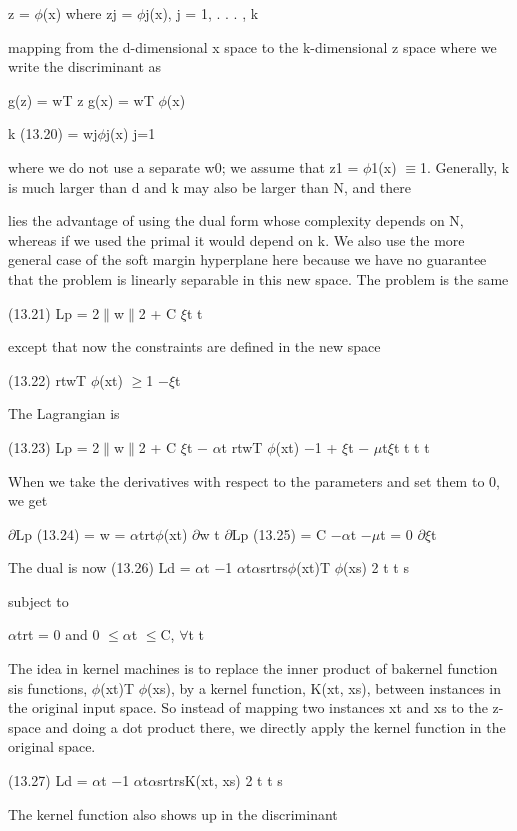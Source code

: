 z = $\phi$(x) where zj = $\phi$j(x), j = 1, . . . , k

mapping from the d-dimensional x space to the k-dimensional z space where we write the discriminant as

g(z) = wT z g(x) = wT $\phi$(x)

k (13.20) = wj$\phi$j(x) j=1

where we do not use a separate w0; we assume that z1 = $\phi$1(x) $\equiv$1. Generally, k is much larger than d and k may also be larger than N, and there

lies the advantage of using the dual form whose complexity depends on N, whereas if we used the primal it would depend on k. We also use the more general case of the soft margin hyperplane here because we have no guarantee that the problem is linearly separable in this new space. The problem is the same

(13.21) Lp = 2$\parallel$w$\parallel$2 + C $\xi$t t

except that now the constraints are defined in the new space

(13.22) rtwT $\phi$(xt) $\geq$1 $-$$\xi$t

The Lagrangian is

(13.23) Lp = 2$\parallel$w$\parallel$2 + C $\xi$t $-$ $\alpha$t rtwT $\phi$(xt) $-$1 + $\xi$t $-$ $\mu$t$\xi$t t t t

When we take the derivatives with respect to the parameters and set them to 0, we get

$\partial$Lp (13.24) = w = $\alpha$trt$\phi$(xt) $\partial$w t $\partial$Lp (13.25) = C $-$$\alpha$t $-$$\mu$t = 0 $\partial$$\xi$t

The dual is now (13.26) Ld = $\alpha$t $-$1 $\alpha$t$\alpha$srtrs$\phi$(xt)T $\phi$(xs) 2 t t s

subject to

$\alpha$trt = 0 and 0 $\leq$$\alpha$t $\leq$C, $\forall$t t

The idea in kernel machines is to replace the inner product of bakernel function sis functions, $\phi$(xt)T $\phi$(xs), by a kernel function, K(xt, xs), between instances in the original input space. So instead of mapping two instances xt and xs to the z-space and doing a dot product there, we directly apply the kernel function in the original space.

(13.27) Ld = $\alpha$t $-$1 $\alpha$t$\alpha$srtrsK(xt, xs) 2 t t s

The kernel function also shows up in the discriminant


